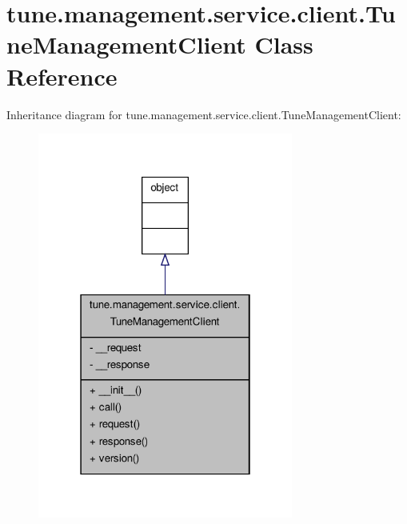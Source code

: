 \hypertarget{classtune_1_1management_1_1service_1_1client_1_1TuneManagementClient}{\section{tune.\-management.\-service.\-client.\-Tune\-Management\-Client Class Reference}
\label{classtune_1_1management_1_1service_1_1client_1_1TuneManagementClient}
}


Inheritance diagram for tune.\-management.\-service.\-client.\-Tune\-Management\-Client\-:
\nopagebreak
\begin{figure}[H]
\begin{center}
\leavevmode
\includegraphics[width=238pt]{classtune_1_1management_1_1service_1_1client_1_1TuneManagementClient__inherit__graph}
\end{center}
\end{figure}


